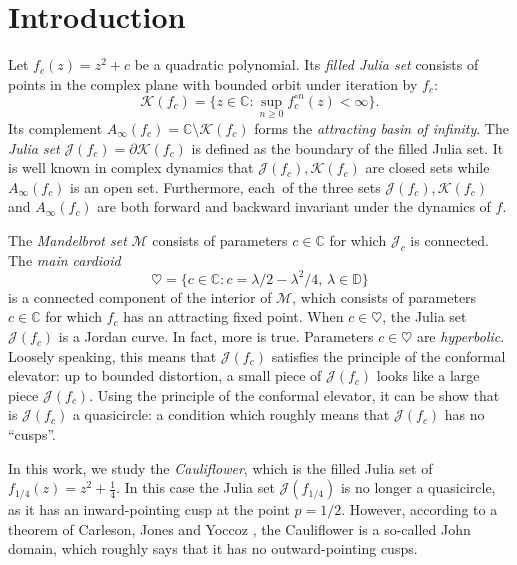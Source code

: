 

\usepackage{subcaption}



\section{Introduction}

% 

Let $f_c(z) = z^2 + c$ be a quadratic polynomial. Its {\em filled Julia set} consists of points in the complex plane with bounded orbit
under iteration by $f_c$:
$$
\mathcal K(f_c) = \{z \in \mathbb{C} : \sup_{n \ge 0} f_c^{\circ n}(z) < \infty \}.
$$
Its complement $A_\infty(f_c) = \mathbb{C} \setminus \mathcal K(f_c)$ forms the {\em attracting basin of infinity}. The
 {\em Julia set} $\mathcal J(f_c) = \partial \mathcal K(f_c)$ is defined as the boundary of the filled Julia set. 
It is well known in complex dynamics that $\mathcal J(f_c), \mathcal K(f_c)$ are closed sets while $A_\infty(f_c)$ is an open set. Furthermore, each\
  of the three sets
$\mathcal J(f_c), \mathcal K(f_c)$ and $A_\infty(f_c)$ are both forward and backward invariant under the dynamics of $f$.
 
 The {\em Mandelbrot set} $\mathcal{M}$ consists of parameters $c \in \mathbb{C}$ for which $\mathcal J_c$ is connected.
The {\em main cardioid}
$$
\heartsuit = \bigl  \{c \in \mathbb{C}: c = \lambda/2 - \lambda^2/4,\, \lambda \in \mathbb{D} \bigr \}
$$
 is a connected component of the interior of $\mathcal M$, which consists of parameters $c \in \mathbb{C}$ for which $f_c$ has an attracting fixed point.
When $c \in \heartsuit$, the Julia set $\mathcal J(f_c)$ is a Jordan curve. In fact, more is true. Parameters $c \in \heartsuit$ are 
{\em hyperbolic}. Loosely speaking, this means that $\mathcal J(f_c)$ satisfies the principle of the conformal elevator: 
up to bounded distortion, a small piece of $\mathcal J(f_c)$ looks like a large piece $\mathcal J(f_c)$.
Using the principle of the conformal elevator, it can be show that is $\mathcal J(f_c)$ a quasicircle: a condition which roughly means that $\mathcal J(f_c)$ has no \enquote{cusps}.

In this work, we study the \emph{Cauliflower}\/, which is the filled Julia set of $f_{1/4}(z) = z^2+\frac{1}{4}$. In this case the Julia set
$\mathcal J(f_{1/4})$ is no longer a quasicircle, as it has an inward-pointing cusp at the point $p=1/2$.
However, according to a theorem of Carleson, Jones and Yoccoz \cite[Theorem 6.1]{carleson_julia_1994}, 
the Cauliflower is a so-called John domain, which roughly says that it has no outward-pointing cusps.

